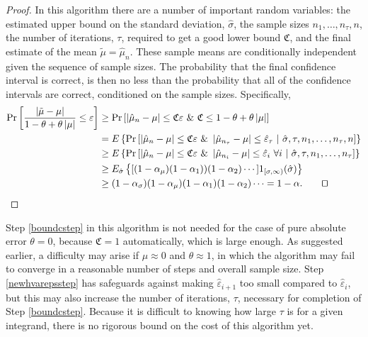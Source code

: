 \documentclass[graybox]{svmult}
\newcommand{\Prob}{\Pr}
\newcommand{\abs}[1]{\left|#1\right|}
\newcommand{\hmu}{\hat{\mu}}
\newcommand{\hvareps}{\hat{\varepsilon}}
\newcommand{\hsigma}{\hat{\sigma}}
\newcommand{\tmu}{\tilde{\mu}}
\newcommand{\fc}{\mathfrak{C}}
\def\abs#1{\ensuremath{\left \lvert #1 \right \rvert}}
\begin{document}
\begin{proof} In this algorithm there are a number of important random variables:  the estimated upper bound on the standard deviation, $\hsigma$, the sample sizes $n_1, \ldots, n_\tau, n$, the number of iterations, $\tau$, required to get a good  lower bound $\fc$, and the final estimate of the mean $\tmu=\hmu_n$. These sample means are conditionally independent given the sequence of sample sizes.  The probability that the final confidence interval is correct, is then no less than the probability that all of the confidence intervals are correct, conditioned on the sample sizes.  Specifically,
\begin{align*}
\Prob\left[\frac{\abs{\tmu-\mu}} {1-\theta + \theta\abs{\mu}} \le \varepsilon \right] & 
\ge \Prob\left[\abs{\hmu_{n}-\mu} \le \fc \varepsilon \ \& \ \fc\le 1-\theta + \theta\abs{\mu} \right] \\
& = E \left\{\Prob\left[\abs{\hmu_{n}-\mu} \le \fc \varepsilon \ \& \ \abs{\hmu_{n_{\tau}}-\mu} \le \hvareps_\tau \ | \ \hsigma, \tau, n_1, \ldots, n_{\tau},n \right] \right\} \\
& \ge E \left\{\Prob\left[\abs{\hmu_{n}-\mu} \le \fc \varepsilon \ \& \ \abs{\hmu_{n_{i}}-\mu} \le \hvareps_i \ \forall i \ | \ \hsigma, \tau, n_1, \ldots, n_{\tau} \right] \right\} \\
& \ge E_{\hsigma} \left\{[(1-\alpha_\mu)(1-\alpha_1) )(1-\alpha_2) \cdots ] 1_{[\sigma,\infty)}(\hsigma) \right\}\\
& \ge (1-\alpha_{\sigma}) (1-\alpha_\mu) (1-\alpha_1)(1-\alpha_2) \cdots = 1-\alpha. \qquad \qed
\end{align*}
\end{proof}

\begin{remark} Step \ref{boundcstep} in this algorithm is not needed for the case of pure absolute error $\theta=0$, because $\fc=1$ automatically, which is large enough.  As suggested earlier, a difficulty may arise if $\mu \approx 0$ and $\theta \approx 1$, in which the algorithm may fail to converge in a reasonable number of steps and overall sample size.  Step \ref{newhvarepsstep} has safeguards against making $\hvareps_{i+1}$ too small compared to $\hvareps_{i}$, but this may also increase the number of iterations, $\tau$, necessary for completion of Step \ref{boundcstep}.  Because it is difficult to knowing how large $\tau$ is for a given integrand, there is no rigorous bound on the cost of this algorithm yet.
\end{remark}
\end{document}
